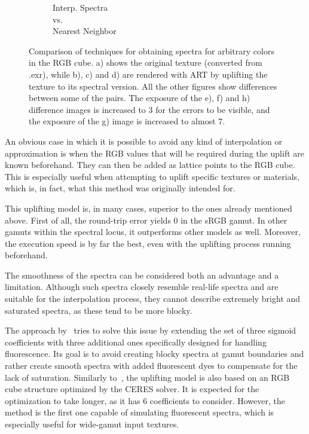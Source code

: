 \begin{figure}[t]
\begin{subfigure}[t]{0.22\textwidth}
		\caption{Interp. Spectra\\vs.\\Nearest Neighbor}
		\label{fig:sigDiffSpectraNeighbor}
	\end{subfigure}
	\caption{Comparison of techniques for obtaining spectra for arbitrary colors in the RGB cube. a) shows the original texture (converted from .exr), while b), c) and d) are rendered with ART by uplifting the texture to its spectral version. All the other figures show differences between some of the pairs. The exposure of the e), f) and h) difference images is increased to 3 for the errors to be visible, and the exposure of the g) image is increased to almost 7.}
	\label{fig:sigmoidTexture}
\end{figure}

An obvious case in which it is possible to avoid any kind of interpolation or approximation is when the RGB values that will be required during the uplift are known beforehand. They can then be added as lattice points to the RGB cube. This is especially useful when attempting to uplift specific textures or materials, which is, in fact, what this method was originally intended for.

This uplifting model is, in many cases, superior to the ones already mentioned above. First of all, the round-trip error yields 0 in the sRGB gamut. In other gamuts within the spectral locus, it outperforms other models as well. Moreover, the execution speed is by far the best, even with the uplifting process running beforehand. 

The smoothness of the spectra can be considered both an advantage and a limitation. Although such spectra closely resemble real-life spectra and are suitable for the interpolation process, they cannot describe extremely bright and saturated spectra, as these tend to be more blocky.

The approach by~\citet{upsamplingFluorescence} tries to solve this issue by extending the set of three sigmoid coefficients with three additional ones specifically designed for handling fluorescence. Its goal is to avoid creating blocky spectra at gamut boundaries and rather create smooth spectra with added fluorescent dyes to compensate for the lack of saturation. Similarly to~\citet{upsamplingJakobHanika}, the uplifting model is also based on an RGB cube structure optimized by the CERES solver. It is expected for the optimization to take longer, as it has 6 coefficients to consider. However, the method is the first one capable of simulating fluorescent spectra, which is especially useful for wide-gamut input textures.

